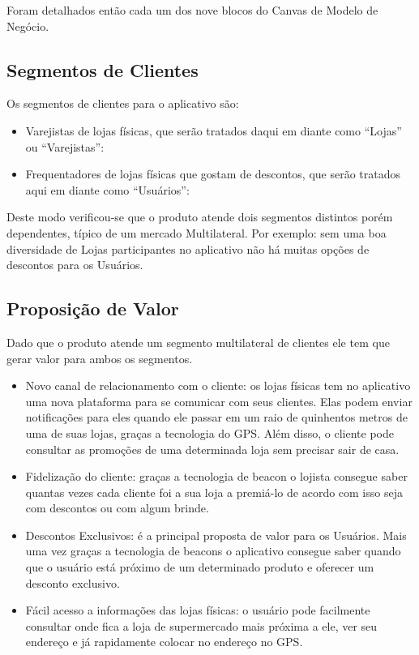 Foram detalhados então cada um dos nove blocos do Canvas de Modelo de Negócio.
\subsection{Segmentos de Clientes}
\label{cha:segmentos_de_clientes}
Os segmentos de clientes para o aplicativo são:
\begin{itemize}
\item Varejistas de lojas físicas, que serão tratados daqui em diante como \enquote{Lojas} ou \enquote{Varejistas}: 
\item Frequentadores de lojas físicas que gostam de descontos, que serão tratados aqui em diante como \enquote{Usuários}: 
\end{itemize}
Deste modo verificou-se que o produto atende dois segmentos distintos porém dependentes, típico de um mercado Multilateral. Por exemplo: sem uma boa diversidade de Lojas participantes no aplicativo não há muitas opções de descontos para os Usuários.

\subsection{Proposição de Valor}
\label{cha:proposicao_de_valor}
Dado que o produto atende um segmento multilateral de clientes ele tem que gerar valor para ambos os segmentos.
\begin{itemize}
\item Novo canal de relacionamento com o cliente: os lojas físicas tem no aplicativo uma nova plataforma para se comunicar com seus clientes. Elas podem enviar notificações para eles quando ele passar em um raio de quinhentos metros de uma de suas lojas, graças a tecnologia do GPS. Além disso, o cliente pode consultar as promoções de uma determinada loja sem precisar sair de casa.
\item Fidelização do cliente: graças a tecnologia de beacon o lojista consegue saber quantas vezes cada cliente foi a sua loja a premiá-lo de acordo com isso seja com descontos ou com algum brinde.
\item Descontos Exclusivos: é a principal proposta de valor para os Usuários. Mais uma vez graças a tecnologia de beacons o aplicativo consegue saber quando que o usuário está próximo de um determinado produto e oferecer um desconto exclusivo.
\item Fácil acesso a informações das lojas físicas: o usuário pode facilmente consultar onde fica a loja de supermercado mais próxima a ele, ver seu endereço e já rapidamente colocar no endereço no GPS.
\end{itemize}

